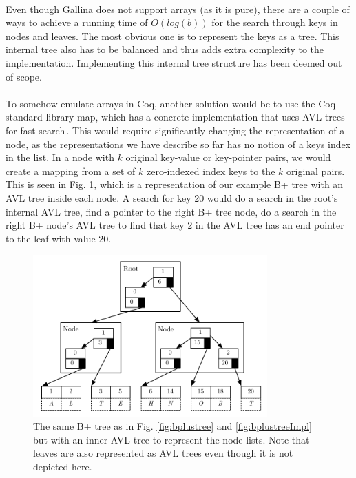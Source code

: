 \paragraph{}
Even though Gallina does not support arrays (as it is pure), there are a couple of ways to achieve a running time of $O(log(b))$ for the search through keys in nodes and leaves. The most obvious one is to represent the keys as a tree. This internal tree also has to be balanced and thus adds extra complexity to the implementation. Implementing this internal tree structure has been deemed out of scope. 
\paragraph{}
To somehow emulate arrays in Coq, another solution would be to use the Coq standard library map, which has a concrete implementation that uses AVL trees for fast search\,\cite{fmapavl}. This would require significantly changing the representation of a node, as the representations we have describe so far has no notion of a keys index in the list. In a node with $k$ original key-value or key-pointer pairs, we would create a mapping from a set of $k$ zero-indexed index keys to the $k$ original pairs. This is seen in Fig. \ref{fig:bplustreeAVLImpl}, which is a representation of our example B+ tree with an AVL tree inside each node. A search for key 20 would do a search in the root's internal AVL tree, find a pointer to the right B+ tree node, do a search in the right B+ node's AVL tree to find that key 2 in the AVL tree has an end pointer to the leaf with value 20. 

\begin{figure}
 \centering
   \includegraphics[width=90mm]{diagrams/BPlusTreeMapImpl.pdf}
 \caption{The same B+ tree as in Fig. \ref{fig:bplustree} and \ref{fig:bplustreeImpl} but with an inner AVL tree to represent the node lists. Note that leaves are also represented as AVL trees even though it is not depicted here.}
 \label{fig:bplustreeAVLImpl}
\end{figure}

